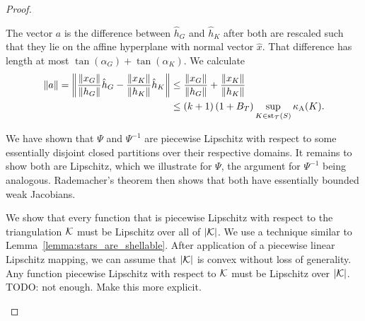 \documentclass[10pt,letterpaper]{article}
\newcommand{\mwl}[1]{{\color{red}#1}}
\begin{document}
\begin{proof}
\begin{itemize}
        
        
        The vector $a$ is the difference between $\hat h_{G}$ and $\hat h_{K}$ after both are rescaled such that they lie on the affine hyperplane with normal vector $\hat x$. That difference has length at most $\tan(\alpha_{G}) + \tan(\alpha_{K})$.
        We calculate 
        \begin{align*}
            \|a\|
            = 
            \left\|
            \frac{\|x_{G}\|}{\|h_{G}\|} \hat h_{{G}} 
            - 
            \frac{\|x_{K}\|}{\|h_{K}\|} \hat h_K
            \right\|
            &
            \leq 
            \frac{\|x_{G}\|}{\|h_{G}\|} 
            + 
            \frac{\|x_{K}\|}{\|h_{K}\|} 
            \\&
            \leq 
            (k+1) 
            \left( 1 + B_{T} \right)
            \sup_{ K \in \patch_{\calT}(S) }
            \aspectratio(K) %
            .
        \end{align*}
        
        We have shown that $\Psi$ and $\Psi^{-1}$ are piecewise Lipschitz with respect to some essentially disjoint closed partitions over their respective domains.
        It remains to show both are Lipschitz, which we illustrate for $\Psi$, the argument for $\Psi^{-1}$ being analogous. 
        Rademacher's theorem then shows that both have essentially bounded weak Jacobians. 
        
        We show that every function that is piecewise Lipschitz with respect to the triangulation ${\mathcal K}$ must be Lipschitz over all of $|{\mathcal K}|$. 
        We use a technique similar to Lemma~\ref{lemma:stars_are_shellable}. 
        After application of a piecewise linear Lipschitz mapping, 
        we can assume that $|{\mathcal K}|$ is convex without loss of generality. 
        Any function piecewise Lipschitz with respect to ${\mathcal K}$ must be Lipschitz over $|{\mathcal K}|$. 
        \mwl{TODO: not enough. Make this more explicit.}
        

\end{itemize}
\end{proof}
\end{document}
